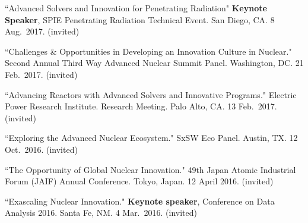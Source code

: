 \begin{bibsection}
\item ``Advanced Solvers and Innovation for Penetrating Radiation" \textbf{Keynote Speaker}, SPIE Penetrating Radiation Technical Event. San Diego, CA. 8 Aug.\ 2017. (invited)


\item ``Challenges \& Opportunities in Developing an Innovation Culture in Nuclear." Second Annual Third Way Advanced Nuclear Summit Panel. Washington, DC. 21 Feb.\ 2017. (invited)

\item ``Advancing Reactors with Advanced Solvers and Innovative Programs." Electric Power Research Institute. Research Meeting. Palo Alto, CA. 13 Feb.\ 2017. (invited)

\item ``Exploring the Advanced Nuclear Ecosystem." SxSW Eco Panel. Austin, TX. 12 Oct.\ 2016. (invited)






\item ``The Opportunity of Global Nuclear Innovation." 49th Japan Atomic Industrial Forum (JAIF) Annual Conference. Tokyo, Japan. 12 April 2016. (invited)

\item ``Exascaling Nuclear Innovation." \textbf{Keynote speaker}, Conference on Data Analysis 2016. Santa Fe, NM. 4 Mar.\ 2016. (invited) 


\end{bibsection}
